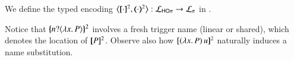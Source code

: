 \smallskip 

\begin{definition}
\label{d:enc:hopitopi}
We define the typed encoding 
$\enco{\map{\cdot}^{2}, \mapt{\cdot}^{2} %
}: \tyl{L}_{\HOp} \to \tyl{L}_{\sessp}$  
in . 
\end{definition}

\smallskip 
\noi 
Notice that $\{\!\!\{n ? \langle \lambda  x.\,P \rangle \}\!\!\}^2$ involves a fresh
trigger name (linear or shared), 
which denotes the location of $[\!\![P]\!\!]^2$. 
Observe also how $[\!\![(\lambda x.\,P)\, {u}]\!\!]^2$ naturally induces a name substitution.
\smallskip 
